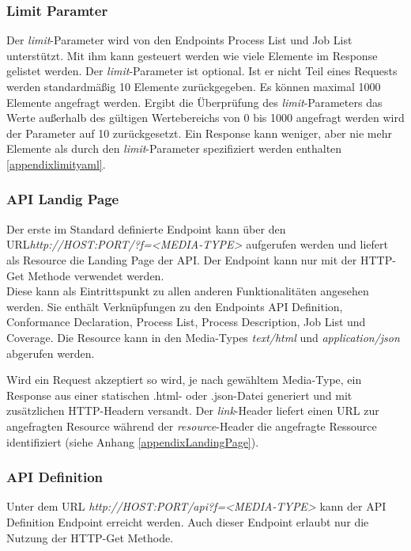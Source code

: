 \subsubsection{Limit Paramter}
Der \textit{limit}-Parameter wird von den Endpoints Process List und Job List unterstützt. Mit ihm kann gesteuert werden wie viele Elemente im Response gelistet werden. 
Der \textit{limit}-Parameter ist optional. Ist er nicht Teil eines Requests werden standardmäßig 10 Elemente zurückgegeben. Es können maximal 1000 Elemente angefragt werden.
Ergibt die Überprüfung des \textit{limit}-Parameters das Werte außerhalb des gültigen Wertebereichs von 0 bis 1000 angefragt werden wird der Parameter auf 10 zurückgesetzt. 
Ein Response kann weniger, aber nie mehr Elemente als durch den \textit{limit}-Parameter spezifiziert werden enthalten \ref{appendixlimityaml}. 

\subsubsection{API Landig Page}
Der erste im Standard definierte Endpoint kann über den URL\textit{http://HOST:PORT/?f=<MEDIA-TYPE>} aufgerufen werden und liefert als Resource die 
Landing Page der API. Der Endpoint kann nur mit der HTTP-Get Methode verwendet werden. \\ 

Diese kann als Eintrittspunkt zu allen anderen Funktionalitäten angesehen werden. Sie enthält Verknüpfungen zu den Endpoints API Definition, 
Conformance Declaration, Process List, Process Description, Job List und Coverage. Die Resource kann in den Media-Types \textit{text/html} und \textit{application/json} abgerufen werden. 
 
Wird ein Request akzeptiert so wird, je nach gewähltem Media-Type, ein Response aus einer statischen .html- oder .json-Datei generiert und mit zusätzlichen 
HTTP-Headern versandt. Der \textit{link}-Header liefert einen URL zur angefragten Resource während der \textit{resource}-Header die angefragte Ressource 
identifiziert (siehe Anhang \ref{appendixLandingPage}). 

\subsubsection{API Definition}
Unter dem URL \textit{http://HOST:PORT/api?f=<MEDIA-TYPE>} kann der API Definition Endpoint erreicht werden. Auch dieser Endpoint erlaubt nur die Nutzung der HTTP-Get Methode.\\

